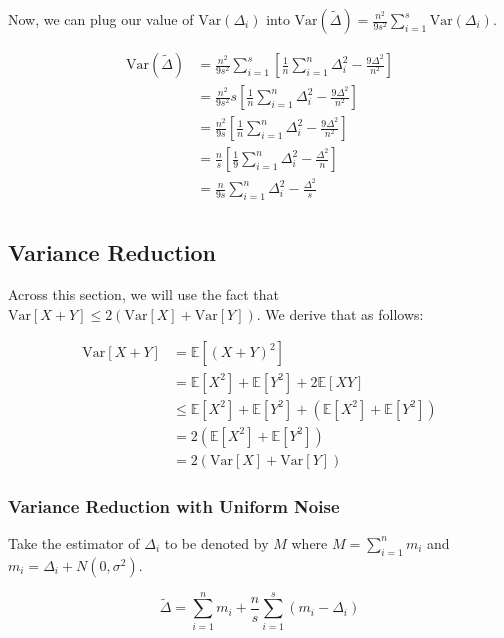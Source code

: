 \documentclass[11pt]{article}
\begin{document}
Now, we can plug our value of $\mathrm{Var}(\Delta_i)$ into $\mathrm{Var}(\tilde{\Delta}) = \frac{n^2}{9s^2} \sum_{i=1}^{s} \mathrm{Var}(\Delta_i)$.

\[
\begin{aligned}
\mathrm{Var}(\tilde{\Delta}) &= \frac{n^2}{9s^2} \sum_{i=1}^{s} [\frac{1}{n} \sum_{i = 1}^{n} \Delta_i^2 - \frac{9\Delta^2}{n^2}] \\
&= \frac{n^2}{9s^2} s [\frac{1}{n} \sum_{i = 1}^{n} \Delta_i^2 - \frac{9\Delta^2}{n^2}] \\
&= \frac{n^2}{9s} [\frac{1}{n} \sum_{i = 1}^{n} \Delta_i^2 - \frac{9\Delta^2}{n^2}] \\
&= \frac{n}{s} [\frac{1}{9}\sum_{i = 1}^{n} \Delta_i^2 - \frac{\Delta^2}{n}] \\
&= \frac{n}{9s} \sum_{i = 1}^{n} \Delta_i^2 - \frac{\Delta^2}{s} \\
\end{aligned}
\]

\subsection{Variance Reduction}

Across this section, we will use the fact that $\mathrm{Var}[X+Y] \leq 2(\mathrm{Var}[X] + \mathrm{Var}[Y])$. We derive that as follows:

\[
\begin{aligned}
    \mathrm{Var}[X+Y] &= \mathbb{E}[(X+Y)^2] \\
    &= \mathbb{E}[X^2] + \mathbb{E}[Y^2] + 2\mathbb{E}[XY] \\
    &\leq \mathbb{E}[X^2] + \mathbb{E}[Y^2] + (\mathbb{E}[X^2] + \mathbb{E}[Y^2]) \\
    &= 2(\mathbb{E}[X^2] + \mathbb{E}[Y^2]) \\
    &= 2(\mathrm{Var}[X] + \mathrm{Var}[Y])
\end{aligned}
\]

\subsubsection{Variance Reduction with Uniform Noise}

Take the estimator of $\Delta_i$ to be denoted by $M$ where $M = \sum_{i = 1}^{n} m_i$ and $m_i = \Delta_i + N(0, \sigma^2)$.

\[
\tilde{\Delta} = \sum_{i = 1}^{n} m_i + \frac{n}{s} \sum_{i = 1}^{s} (m_i - \Delta_i)
\]
\end{document}
